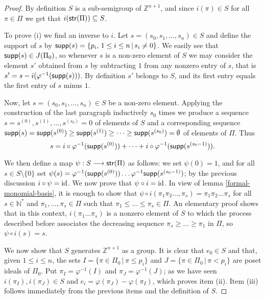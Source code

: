 \documentclass[twoside,11pt]{article}
\newcommand{\id}{{\rm id}}
\newcommand{\N}{{\mathbb N}}
\newcommand{\Z}{{\mathbb Z}}
\newcommand{\supp}{{\sf supp}}
\newcommand{\StMon}{{\sf str}}
\newcommand{\tq}{\,|\,}
\begin{document}
\begin{proof} By definition $S$ is a sub-semigroup of $\Z^{n+1}$, and since $i(\pi) \in S$
	for all $\pi\in\Pi$ we get that $i(\StMon(\Pi)) \subseteq S$.

To prove (i) we find an inverse to $i$. Let $s=(s_0,s_1,\dots,s_n)\in S$ and define the
support of $s$ by $\supp(s)=\{p_i, \, 1 \le i \le n \tq s_i \neq 0\}$. We easily see that
$\supp(s) \in J(\Pi_0)$, so whenever $s$ is a non-zero element of $S$ we may consider the
element $s'$ obtained from $s$ by subtracting $1$ from any nonzero entry of $s$, that is
$s'=s-i(\varphi^{-1}(\supp(s)))$. By definition $s'$ belongs to $S$, and its first entry
equals the first entry of $s$ minus $1$.

Now, let $s=(s_0,s_1,\dots,s_n)\in S$ be a non-zero element. Applying the construction of
the last paragraph inductively $s_0$ times we produce a sequence $s = s^{(0)}, s^{(1)},
\ldots, s^{(s_0)} = 0$ of elements of $S$ and a corresponding sequence
$\supp(s)=\supp(s^{(0)}) \ge \supp(s^{(1)})\ge\dots\ge \supp(s^{(s_0)})=\emptyset $ of
elements of $\Pi$. Thus
\[
s = i\circ\varphi^{-1}(\supp(s^{(0)})) + \dots + i\circ\varphi^{-1}(\supp(s^{(s_0-1)})).  
\]

We then define a map $\psi:S \longrightarrow\StMon(\Pi)$ as follows: we set $\psi(0) = 1$,
and for all $s\in S\setminus\{0\}$ set $\psi(s)=\varphi^{-1}(\supp(s^{(0)})) \dots
\varphi^{-1}\supp(s^{(s_0-1)})$; by the previous discussion $i \circ \psi = \id$. We now
prove that $\psi \circ i = \id$. In view of lemma \ref{formal-monomial-basis}, it is
enough to show that $\psi\circ i(\pi_1 \pi_2 \dots, \pi_s)=\pi_1 \pi_2\dots \pi_s$ for all
$s\in\N^*$ and $\pi_1, \dots, \pi_s\in\Pi$ such that $\pi_1 \le \dots \le \pi_s \in \Pi$.
An elementary proof shows that in this context, $i(\pi_1 \dots \pi_s)$ is a nonzero
element of $S$ to which the process described before associates the decreasing sequence
$\pi_s \ge \dots \ge \pi_1$ in $\Pi$, so $\psi\circ i(s)=s$.

We now show that $S$ generates $\Z^{n+1}$ as a group. It is clear that $e_0\in S$ and
that, given $1 \le i\le n$, the sets $I=\{\pi\in\Pi_0 \tq \pi\le p_i\}$ and
$J=\{\pi\in\Pi_0 \tq \pi < p_i\}$ are poset ideals of $\Pi_0$. Put $\pi_I=\varphi^{-1}(I)$
and $\pi_J=\varphi^{-1}(J)$; as we have seen $i(\pi_I),i(\pi_J)\in S$ and
$e_i=\varphi(\pi_J)-\varphi(\pi_I)$, which proves item (ii). Item (iii) follows
immediately from the previous items and the definition of $S$. \end{proof}
\end{document}
